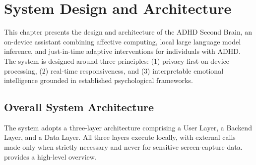 \chapter{System Design and Architecture}
\label{ch:system_design}

This chapter presents the design and architecture of the ADHD Second Brain, an on-device assistant combining affective computing, local large language model inference, and just-in-time adaptive interventions for individuals with ADHD. The system is designed around three principles: (1) privacy-first on-device processing, (2) real-time responsiveness, and (3) interpretable emotional intelligence grounded in established psychological frameworks.

\section{Overall System Architecture}
\label{sec:overall_architecture}

The system adopts a three-layer architecture comprising a User Layer, a Backend Layer, and a Data Layer. All three layers execute locally, with external calls made only when strictly necessary and never for sensitive screen-capture data.  provides a high-level overview.


